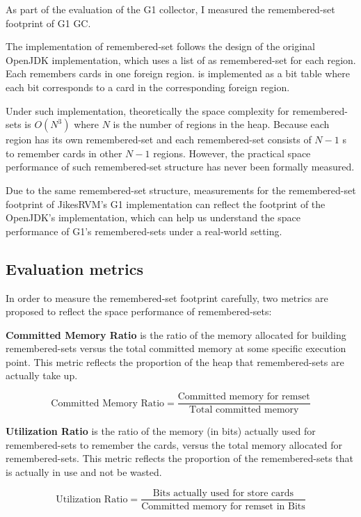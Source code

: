 As part of the evaluation of the G1 collector, I measured the remembered-set footprint
of G1 GC.

The implementation of remembered-set follows the design of the original OpenJDK
implementation, which uses a list of  as remembered-set
for each region. Each  remembers cards in one foreign region.
 is implemented as a bit table where each bit corresponds
to a card in the corresponding foreign region. 

Under such implementation, theoretically the space complexity for remembered-sets
is $O(N^3)$ where $N$ is the number of regions in the heap. Because each region
has its own remembered-set and each remembered-set consists of $N-1$ s
to remember cards in other $N-1$ regions. However, the practical space performance
of such remembered-set structure has never been formally measured.

Due to the same remembered-set structure,
measurements for the remembered-set footprint of JikesRVM's G1 implementation can reflect
the footprint of the OpenJDK's implementation, which can help us understand the
space performance of G1's remembered-sets under a real-world setting.

\subsection{Evaluation metrics}

In order to measure the remembered-set footprint carefully, two metrics are proposed
to reflect the space performance of remembered-sets:

\textbf{Committed Memory Ratio} is the ratio of the memory allocated for building remembered-sets
versus the total committed memory at some specific execution point.
This metric reflects the proportion of the heap that remembered-sets are actually take up.

$$ \text{Committed Memory Ratio} = \frac{\text{Committed memory for remset}}{\text{Total committed memory}} $$

\textbf{Utilization Ratio} is the ratio of the memory (in bits) actually used for
remembered-sets to remember the cards, versus the total memory allocated for remembered-sets.
This metric reflects the proportion of the remembered-sets that is actually in use
and not be wasted.

$$ \text{Utilization Ratio} = \frac{\text{Bits actually used for store cards}}{\text{Committed memory for remset in Bits}} $$

